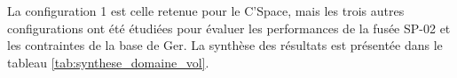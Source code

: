 




La configuration 1 est celle retenue pour le C'Space, mais les trois autres configurations ont été étudiées pour évaluer les
performances de la fusée SP-02 et les contraintes de la base de Ger. La synthèse des résultats est présentée dans le tableau
\ref{tab:synthese_domaine_vol}.

